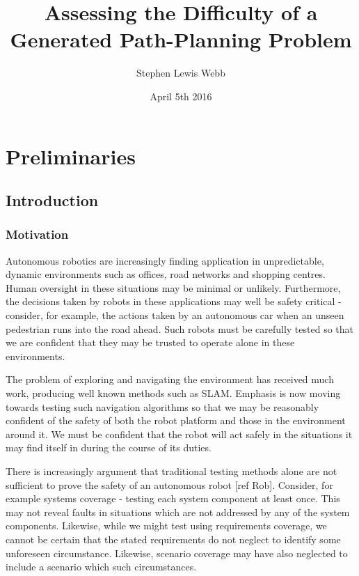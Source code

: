 \documentclass[authoryearcitations]{UoYCSproject}
\author{Stephen Lewis Webb}
\title{Assessing the Difficulty of a Generated Path-Planning Problem}
\date{April 5th 2016}
\begin{document}
\maketitle
\listoffigures
\listoftables
\cleardoublepage

\part{Preliminaries}
\label{sec:start}
\thispagestyle{empty}\cleardoublepage
\chapter{Introduction}
\label{cha:Introduction}
\section{Motivation}
\label{sec:Motivation}
Autonomous robotics are increasingly finding application in unpredictable, dynamic environments such as offices, road networks and shopping centres. Human oversight in these situations may be minimal or unlikely. Furthermore, the decisions taken by robots in these applications may well be safety critical - consider, for example, the actions taken by an autonomous car when an unseen pedestrian runs into the road ahead. Such robots must be carefully tested so that we are confident that they may be trusted to operate alone in these environments.

The problem of exploring and navigating the environment has received much work, producing well known methods such as SLAM. Emphasis is now moving towards testing such navigation algorithms so that we may be reasonably confident of the safety of both the robot platform and those in the environment around it. We must be confident that the robot will act safely in the situations it may find itself in during the course of its duties.

There is increasingly argument that traditional testing methods alone are not sufficient to prove the safety of an autonomous robot [ref Rob]. Consider, for example systems coverage - testing each system component at least once. This may not reveal faults in situations which are not addressed by any of the system components. Likewise, while we might test using requirements coverage, we cannot be certain that the stated requirements do not neglect to identify some unforeseen circumstance. Likewise, scenario coverage may have also neglected to include a scenario which such circumstances.
\end{document}
